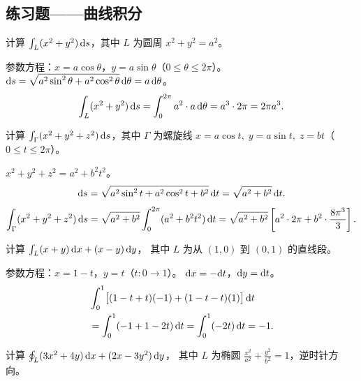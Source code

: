 \documentclass{article}
\begin{document}
\subsection{练习题——曲线积分}

\begin{exercise}
  计算 $\int_L (x^2 + y^2) \,\mathrm{d} s$，其中 $L$ 为圆周 $x^2 + y^2 = a^2$。
\end{exercise}

\begin{solution}
  参数方程：$x = a\cos\theta$，$y = a\sin\theta$（$0 \le \theta \le 2\pi$）。
  $\mathrm{d} s = \sqrt{a^2\sin^2\theta + a^2\cos^2\theta}\,\mathrm{d}\theta =
  a\,\mathrm{d}\theta$。
  \[
    \int_L (x^2+y^2) \,\mathrm{d} s
    = \int_0^{2\pi} a^2 \cdot a \,\mathrm{d}\theta
    = a^3 \cdot 2\pi
    = 2\pi a^3.
  \]
\end{solution}

\begin{exercise}
  计算 $\int_\Gamma (x^2+y^2+z^2) \,\mathrm{d} s$，其中 $\Gamma$ 为螺旋线
  $x = a\cos t,\; y = a\sin t,\; z = bt$（$0 \le t \le 2\pi$）。
\end{exercise}

\begin{solution}
  $x^2+y^2+z^2 = a^2 + b^2 t^2$。
  \[
    \mathrm{d} s = \sqrt{a^2\sin^2 t + a^2\cos^2 t + b^2}\,\mathrm{d} t =
    \sqrt{a^2+b^2}\,\mathrm{d} t.
  \]
  \[
    \int_\Gamma (x^2+y^2+z^2) \,\mathrm{d} s
    = \sqrt{a^2+b^2} \int_0^{2\pi} (a^2 + b^2 t^2) \,\mathrm{d} t
    = \sqrt{a^2+b^2} \left[ a^2 \cdot 2\pi + b^2 \cdot \frac{8\pi^3}{3} \right].
  \]
\end{solution}

\begin{exercise}
  计算 $\int_L (x+y) \,\mathrm{d} x + (x-y) \,\mathrm{d} y$，
  其中 $L$ 为从 $(1,0)$ 到 $(0,1)$ 的直线段。
\end{exercise}

\begin{solution}
  参数方程：$x = 1-t$，$y = t$（$t: 0 \to 1$）。
  $\mathrm{d} x = -\mathrm{d} t$，$\mathrm{d} y = \mathrm{d} t$。
  \begin{align*}
    &\int_0^1 \bigl[(1-t+t)(-1) + (1-t-t)(1)\bigr] \,\mathrm{d} t \\
    &= \int_0^1 (-1 + 1 - 2t) \,\mathrm{d} t
    = \int_0^1 (-2t) \,\mathrm{d} t = -1.
  \end{align*}
\end{solution}

\begin{exercise}[第二类曲线积分——椭圆]
  计算 $\oint_L (3x^2 + 4y) \,\mathrm{d} x + (2x - 3y^2) \,\mathrm{d} y$，
  其中 $L$ 为椭圆 $\frac{x^2}{a^2}+\frac{y^2}{b^2}=1$，逆时针方向。
\end{exercise}
\end{document}
